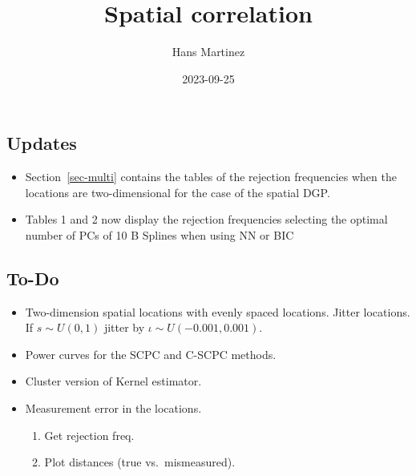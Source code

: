 \documentclass[
]{article}
\title{Spatial correlation}
\author{Hans Martinez}
\date{2023-09-25}
\providecommand{\tightlist}{%
  \setlength{\itemsep}{0pt}\setlength{\parskip}{0pt}}\usepackage{longtable,booktabs,array}
\begin{document}
\maketitle
\ifdefined\Shaded\renewenvironment{Shaded}{\begin{tcolorbox}[frame hidden, interior hidden, breakable, boxrule=0pt, borderline west={3pt}{0pt}{shadecolor}, sharp corners, enhanced]}{\end{tcolorbox}}\fi

\hypertarget{updates}{%
\subsection*{Updates}\label{updates}}

\begin{itemize}
\tightlist
\item
  Section~\ref{sec-multi} contains the tables of the rejection
  frequencies when the locations are two-dimensional for the case of the
  spatial DGP.
\item 
  Tables 1 and 2 now display the rejection frequencies selecting the optimal number
  of PCs of 10 B Splines when using NN or BIC
\end{itemize}

\hypertarget{to-do}{%
\subsection*{To-Do}\label{to-do}}

\begin{itemize}
\tightlist
\item
  Two-dimension spatial locations with evenly spaced locations. Jitter
  locations. If \(s\sim U(0,1)\) jitter by
  \(\iota\sim U(-0.001,0.001)\).
\item
  Power curves for the SCPC and C-SCPC methods.
\item
  Cluster version of Kernel estimator.
\item
  Measurement error in the locations.

  \begin{enumerate}
  \def\labelenumi{\alph{enumi}.}
  \tightlist
  \item
    Get rejection freq.
  \item
    Plot distances (true vs.~mismeasured).
  \end{enumerate}
\end{itemize}
\end{document}
